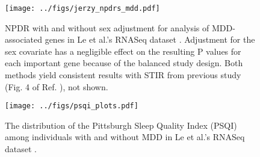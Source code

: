 \documentclass{article}
\begin{document}
\begin{figure}[h]%
\centerline{\texttt{[image: ../figs/jerzy\_npdrs\_mdd.pdf]}}
\caption{NPDR with and without sex adjustment for analysis of MDD-associated genes in Le et al.'s RNASeq dataset \cite{le18}. Adjustment for the sex covariate has a negligible effect on the resulting P values for each important gene because of the balanced study design. Both methods yield consistent results with STIR from previous study (Fig. 4 of Ref. \cite{stir}), not shown.}
\label{fig:jerzy_npdrs_mdd}
\end{figure}

\begin{figure}[h]%
\centerline{\texttt{[image: ../figs/psqi\_plots.pdf]}}
\caption{The distribution of the Pittsburgh Sleep Quality Index (PSQI) among individuals with and without MDD in Le et al.'s RNASeq dataset \cite{le18}.}
\label{fig:psqi_plots}
\end{figure}



\end{document}
